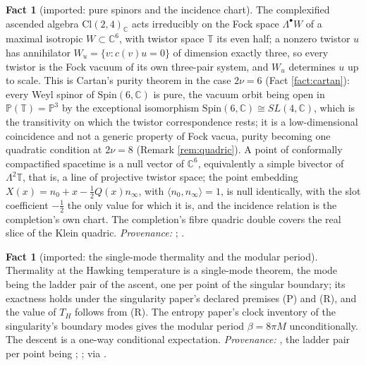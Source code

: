 \documentclass[11pt]{article}
\theoremstyle{definition}
\newtheorem{fact}[theorem]{Fact}
\newcommand{\Cl}{\mathrm{Cl}}
\newcommand{\C}{\mathbb{C}}
\newcommand{\T}{\mathbb{T}}
\newcommand{\ip}[2]{\langle #1, #2\rangle}
\begin{document}
\begin{fact}[imported: pure spinors and the incidence chart]\label{fact:purespinor}
The complexified ascended algebra $\Cl(2,4)_{\C}$ acts irreducibly on the Fock space $\Lambda^{\bullet}W$ of a maximal isotropic $W \subset \C^{6}$, with twistor space $\T$ its even half; a nonzero twistor $u$ has annihilator $W_{u} = \{v : c(v)u = 0\}$ of dimension exactly three, so every twistor is the Fock vacuum of its own three-pair system, and $W_{u}$ determines $u$ up to scale. This is Cartan's purity theorem in the case $2\nu = 6$ (Fact \ref{fact:cartan}): every Weyl spinor of $\mathrm{Spin}(6, \C)$ is pure, the vacuum orbit being open in $\mathbb{P}(\T) = \mathbb{P}^{3}$ by the exceptional isomorphism $\mathrm{Spin}(6, \C) \cong SL(4, \C)$, which is the transitivity on which the twistor correspondence rests; it is a low-dimensional coincidence and not a generic property of Fock vacua, purity becoming one quadratic condition at $2\nu = 8$ (Remark \ref{rem:quadric}). A point of conformally compactified spacetime is a null vector of $\C^{6}$, equivalently a simple bivector of $\Lambda^{2}\T$, that is, a line of projective twistor space; the point embedding $X(x) = n_{0} + x - \tfrac12 Q(x)n_{\infty}$, with $\ip{n_{0}}{n_{\infty}} = 1$, is null identically, with the slot coefficient $-\tfrac12$ the only value for which it is, and the incidence relation is the completion's own chart. The completion's fibre quadric double covers the real slice of the Klein quadric. \emph{Provenance:} \cite[Thm.~3.1, Thm.~3.4, Thm.~4.2, Thm.~5.3]{ButlerT9}; \cite[Fact~2.3, Rem.~5.2]{ButlerT11}.
\end{fact}

\begin{fact}[imported: the single-mode thermality and the modular period]\label{fact:thermality}
Thermality at the Hawking temperature is a single-mode theorem, the mode being the ladder pair of the ascent, one per point of the singular boundary; its exactness holds under the singularity paper's declared premises (P) and (R), and the value of $T_{H}$ follows from (R). The entropy paper's clock inventory of the singularity's boundary modes gives the modular period $\beta = 8\pi M$ unconditionally. The descent is a one-way conditional expectation. \emph{Provenance:} \cite[Thm.~7.3, Rem.~7.33]{ButlerT5}, the ladder pair per point being \cite[Thm.~8.12]{ButlerT4}; \cite[Lem.~4.2]{ButlerT8}; \cite[Prop.~7.5, Thm.~7.6]{ButlerT1} via \cite[Fact~5.9]{ButlerT5}.
\end{fact}
\end{document}
